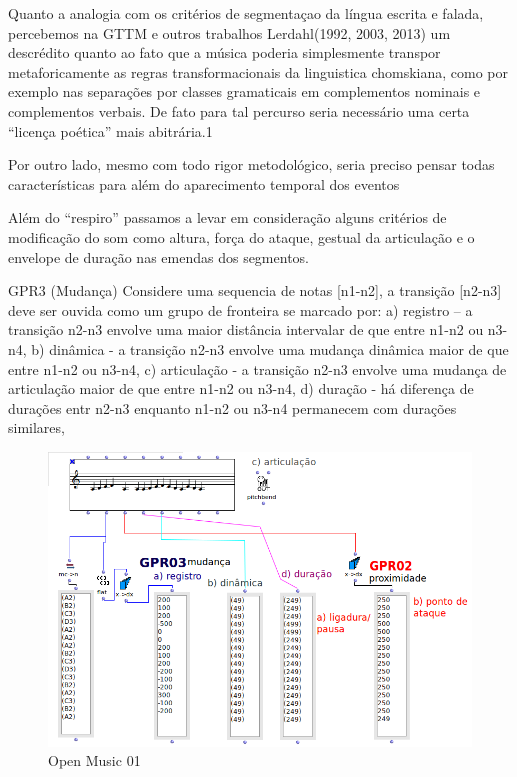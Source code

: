 \documentclass[
	12pt,				%
	openright,			%
	twoside,			%
	a4paper,			%
	english,			%
	french,				%
	spanish,			%
	brazil				%
	]{abntex2}
\begin{document}
Quanto a analogia com os critérios de segmentaçao da língua escrita e falada, percebemos na GTTM e outros trabalhos Lerdahl(1992, 2003, 2013) um descrédito quanto ao fato que a música poderia simplesmente transpor metaforicamente as regras transformacionais da linguistica chomskiana, como por exemplo nas separações por classes gramaticais em complementos nominais e complementos verbais.  De fato para tal percurso seria necessário uma certa “licença poética” mais abitrária.1

Por outro lado, mesmo com todo rigor metodológico, seria preciso pensar todas características para além do aparecimento temporal dos eventos

Além do “respiro” passamos a levar em consideração alguns critérios de modificação do som como altura, força do ataque, gestual da articulação e o envelope de duração nas emendas dos segmentos.

\begin{citacao}
GPR3 (Mudança) Considere uma sequencia de notas [n1-n2], a transição [n2-n3] deve ser ouvida como um grupo de fronteira se marcado por:
a) registro – a transição n2-n3 envolve uma maior distância intervalar de que entre n1-n2 ou n3-n4,\linebreak
b) dinâmica - a transição n2-n3 envolve uma mudança dinâmica maior de que entre n1-n2 ou n3-n4,\linebreak
c) articulação - a transição n2-n3 envolve uma mudança de articulação maior de que entre n1-n2 ou n3-n4,\linebreak
d) duração - há diferença de durações  entr n2-n3 enquanto n1-n2 ou n3-n4 permanecem com durações similares,
\cite{lerdahl1983generative}
\end{citacao}

\begin{figure}[htb]
	\caption{\label{fig_grafico}Open Music 01}
	\begin{center}
	    \includegraphics[scale=0.5]{mikro/OM_gttm_GPR02-03.png}
	\end{center}
\end{figure}
\end{document}
